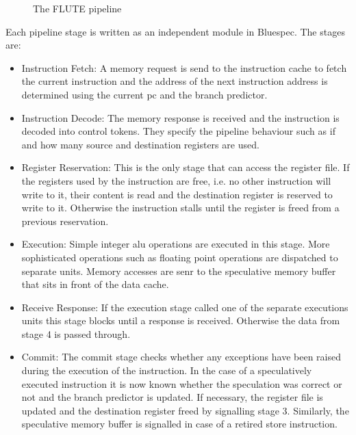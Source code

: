 \documentclass[12pt,twoside,notitlepage]{report}
\begin{document}
\begin{figure}[h]
\centering
\caption{The FLUTE pipeline}
\end{figure}
Each pipeline stage is written as an independent module in Bluespec. The stages are:

\begin{itemize}

\item{Instruction Fetch}: A memory request is send to the instruction cache to fetch the current instruction and the address of the next instruction address is determined using the current \gls{pc} and the branch predictor.

\item{Instruction Decode}: The memory response is received and the instruction is decoded into control tokens. They specify the pipeline behaviour such as if and how many source and destination registers are used.

\item{Register Reservation}: This is the only stage that can access the register file. If the registers used by the instruction are free, i.e. no other instruction will write to it, their content is read and the destination register is reserved to write to it. Otherwise the instruction stalls until the register is freed from a previous reservation.

\item{Execution}: Simple integer \gls{alu} operations are executed in this stage. More sophisticated operations such as floating point operations are dispatched to separate units. Memory accesses are senr to the speculative memory buffer that sits in front of the data cache.

\item{Receive Response}: If the execution stage called one of the separate executions units this stage blocks until a response is received. Otherwise the data from stage 4 is passed through.

\item{Commit}: The commit stage checks whether any exceptions have been raised during the execution of the instruction. In the case of a speculatively executed instruction it is now known whether the speculation was correct or not and the branch predictor is updated. If necessary, the register file is updated and the destination register freed by signalling stage 3. Similarly, the speculative memory buffer is signalled in case of a retired store instruction.
\end{itemize}
\end{document}
